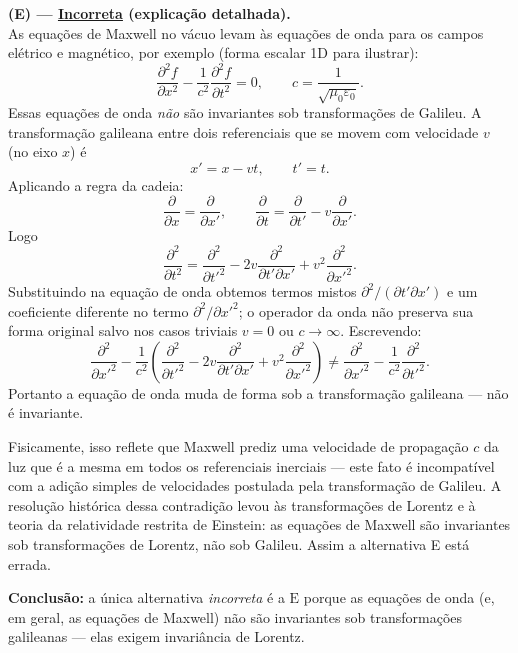 \documentclass[a4paper,12pt]{article}
\begin{document}
\begin{flushleft}
\medskip

\textbf{(E) --- \underline{Incorreta} (explicação detalhada).}\\
As equações de Maxwell no vácuo levam às equações de onda para os campos elétrico e magnético, por exemplo (forma escalar 1D para ilustrar):
\[
\frac{\partial^2 f}{\partial x^2}-\frac{1}{c^2}\frac{\partial^2 f}{\partial t^2}=0,
\qquad c=\frac{1}{\sqrt{\mu_0\varepsilon_0}}.
\]
Essas equações de onda \emph{não} são invariantes sob transformações de Galileu. A transformação galileana entre dois referenciais que se movem com velocidade \(v\) (no eixo \(x\)) é
\[
x'=x-vt,\qquad t'=t.
\]
Aplicando a regra da cadeia:
\[
\frac{\partial}{\partial x}=\frac{\partial}{\partial x'},\qquad
\frac{\partial}{\partial t}=\frac{\partial}{\partial t'}-v\frac{\partial}{\partial x'}.
\]
Logo
\[
\frac{\partial^2}{\partial t^2}
=\frac{\partial^2}{\partial t'^2}-2v\frac{\partial^2}{\partial t'\partial x'}+v^2\frac{\partial^2}{\partial x'^2}.
\]
Substituindo na equação de onda obtemos termos mistos \(\partial^2/(\partial t'\partial x')\) e um coeficiente diferente no termo \(\partial^2/\partial x'^2\); o operador da onda não preserva sua forma original salvo nos casos triviais \(v=0\) ou \(c\to\infty\). Escrevendo:
\[
\frac{\partial^2}{\partial x'^2}-\frac{1}{c^2}\left(\frac{\partial^2}{\partial t'^2}-2v\frac{\partial^2}{\partial t'\partial x'}+v^2\frac{\partial^2}{\partial x'^2}\right)
\neq
\frac{\partial^2}{\partial x'^2}-\frac{1}{c^2}\frac{\partial^2}{\partial t'^2}.
\]
Portanto a equação de onda muda de forma sob a transformação galileana — não é invariante.

Fisicamente, isso reflete que Maxwell prediz uma velocidade de propagação \(c\) da luz que é a mesma em todos os referenciais inerciais — este fato é incompatível com a adição simples de velocidades postulada pela transformação de Galileu. A resolução histórica dessa contradição levou às transformações de Lorentz e à teoria da relatividade restrita de Einstein: as equações de Maxwell são invariantes sob transformações de Lorentz, não sob Galileu. Assim a alternativa E está errada.

\bigskip

\textbf{Conclusão:} a única alternativa \emph{incorreta} é a \(\boxed{\text{E}}\) porque as equações de onda (e, em geral, as equações de Maxwell) não são invariantes sob transformações galileanas — elas exigem invariância de Lorentz.
\end{flushleft}


\newpage 
\end{document}
